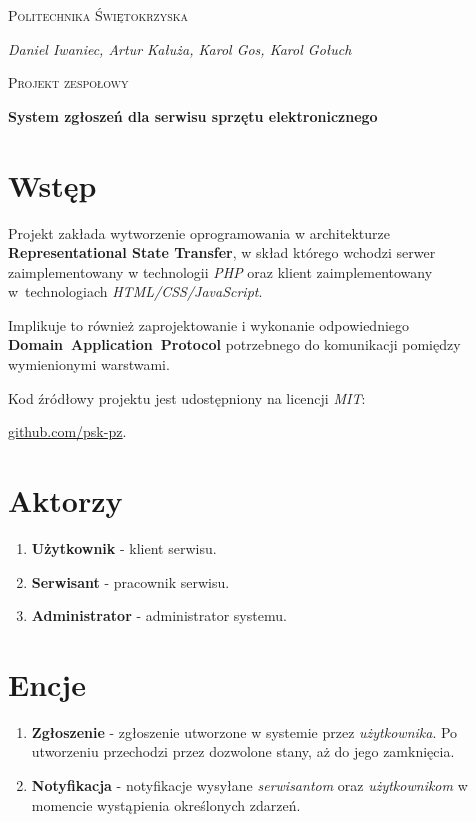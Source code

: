 \documentclass[11pt,a4paper]{article}
\begin{document}
\begin{titlepage}
    \centering
    {\scshape\huge Politechnika Świętokrzyska \par}
    \vspace{0.5cm}
    {\Large\itshape Daniel Iwaniec, Artur Kałuża, Karol Gos, Karol Gołuch\par}
    \vspace{2cm}
    {\scshape\LARGE Projekt zespołowy\par}
    \vspace{0.5cm}
    {\bfseries System zgłoszeń dla serwisu sprzętu elektronicznego\par}

    \vfil

    \raggedright
    \section{Wstęp}
    Projekt zakłada wytworzenie oprogramowania w architekturze \textbf{Representational State Transfer}, w skład którego wchodzi serwer zaimplementowany w technologii \textit{PHP} oraz klient zaimplementowany w~technologiach \textit{HTML/CSS/JavaScript}.
    \par \bigskip Implikuje to również zaprojektowanie i wykonanie odpowiedniego \textbf{Domain~Application~Protocol} potrzebnego do komunikacji pomiędzy wymienionymi warstwami.
    \par \bigskip Kod źródłowy projektu jest udostępniony na licencji \textit{MIT}:
    \par \underline{\href{https://github.com/psk-pz}{github.com/psk-pz}}.
\end{titlepage}

\section{Aktorzy}
\begin{enumerate}
\item{\textbf{Użytkownik} - klient serwisu.}
\item{\textbf{Serwisant} - pracownik serwisu.}
\item{\textbf{Administrator} - administrator systemu.}
\end{enumerate}

\section{Encje}
\begin{enumerate}
\item{\textbf{Zgłoszenie} - zgłoszenie utworzone w systemie przez \textit{użytkownika}. Po utworzeniu przechodzi przez dozwolone stany, aż do jego zamknięcia.}
\item{\textbf{Notyfikacja} - notyfikacje wysyłane \textit{serwisantom} oraz \textit{użytkownikom} w momencie wystąpienia określonych zdarzeń.}
\end{enumerate}
\end{document}
